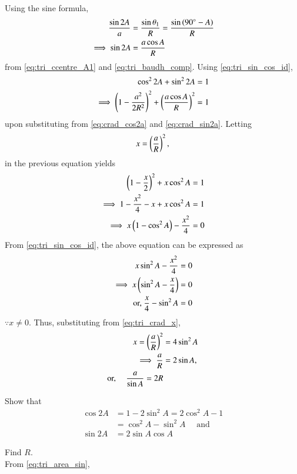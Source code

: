 \iffalse
\fi
  \iffalse
Using the sine formula, 
\begin{align}
\frac{\sin 2A}{a} &= \frac{\sin \theta_1}{R} = \frac{\sin\left(90\degree- A\right)}{R}
\\
\implies \sin 2A &= \frac{a\cos A}{R}
\label{eq:crad_sin2a}
\end{align}
%
from \eqref{eq:tri_ccentre_A1} and \eqref{eq:tri_baudh_comp}.	Using \eqref{eq:tri_sin_cos_id}, 
\begin{align}
\cos^2 2A + \sin^2 2A&= 1
\\
\implies \left(1 -\frac{a^2}{2R^2}\right)^2 + \left(\frac{a\cos A}{R}\right)^2 &= 1
\end{align}
%
upon substituting from \eqref{eq:crad_cos2a}  and \eqref{eq:crad_sin2a}.  Letting
%
\begin{align}
\label{eq:tri_crad_x}
x = \left(\frac{a}{R}\right)^2,
\end{align}
%
in the previous equation yields
%
\begin{align}
 \left(1 -\frac{x}{2}\right)^2 + x\cos^2 A&= 1
\\
\implies 1 - \frac{x^2}{4} -x + x\cos^2 A&= 1
\\
\implies x\left(1-\cos^2 A\right) - \frac{x^2}{4} &= 0
\end{align}
%
From \eqref{eq:tri_sin_cos_id}, the above equation can be expressed as
%
\begin{align}
x\sin^2 A - \frac{x^2}{4} &= 0
\\
\implies x\left(\sin^2 A - \frac{x}{4}\right) &= 0
\\
\text{or, } \frac{x}{4} - \sin^2 A &=0
\end{align}
%
$\because x \ne 0$.  Thus, substituting from \eqref{eq:tri_crad_x},
\begin{align}
x = \left(\frac{a}{R}\right)^2 &= 4 \sin^2 A 
\\
\implies \frac{a}{R} &= 2\sin A,
\\
\text{or, }\quad \frac{a}{\sin A} = 2R
\end{align}
%
\item Show that 
\label{eq:cos2x}
\begin{align}
\cos 2A &= 1 -2\sin^2 A = 2\cos^2 A - 1 
\\
&= \cos^2 A - \sin^2A \quad \text{ and }
\\
\sin 2A &= 2 \sin A \cos A
\label{eq:sin2x}
\end{align}
\item Find $R$.
\\
\solution From \eqref{eq:tri_area_sin}, 
